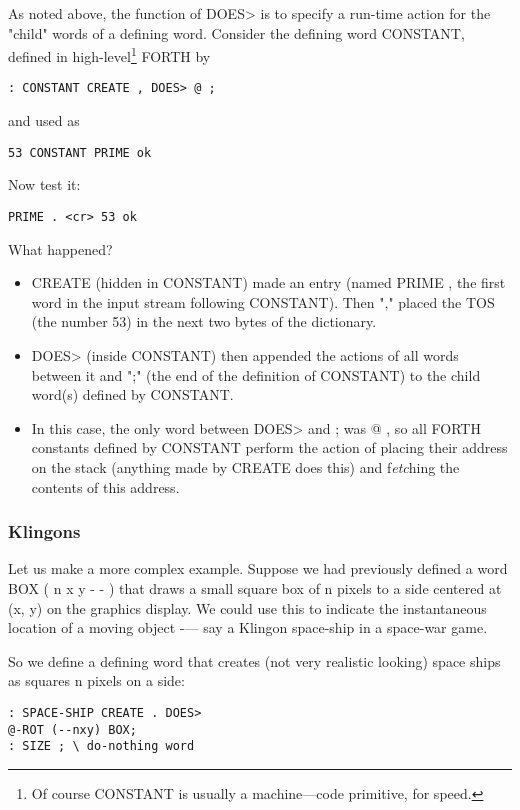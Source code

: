 As noted above, the function of DOES> is to specify a run-time action for the "child" words of a defining word. Consider the defining word CONSTANT, defined in high-level\footnote{Of course CONSTANT is usually a machine—code primitive, for speed.} FORTH by

\begin{verbatim}
: CONSTANT CREATE , DOES> @ ;
\end{verbatim}
and used as
\begin{verbatim}
53 CONSTANT PRIME ok
\end{verbatim}

Now test it:
\begin{verbatim}
PRIME . <cr> 53 ok
\end{verbatim}

What happened?
\begin{itemize}
    \item CREATE (hidden in CONSTANT) made an entry (named PRIME , the first word in the input stream following CONSTANT). Then "," placed the TOS (the number 53) in the next two bytes of the dictionary.
    \item DOES> (inside CONSTANT) then appended the actions of all words between it and ";" (the end of the definition of CONSTANT) to the child word(s) defined by CONSTANT.
    \item In this case, the only word between DOES> and ; was @ , so all FORTH constants defined by CONSTANT perform the action of placing their address on the stack (anything made by CREATE does this) and f\textit{etc}hing the contents of this address.
\end{itemize}

\subsubsection{Klingons}
Let us make a more complex example. Suppose we had previously defined a word BOX ( n x y - - ) that draws a small square box of n pixels to a side centered at (x, y) on the graphics display. We could use this to indicate the instantaneous location of a moving object -— say a Klingon space-ship in a space-war game.

So we define a defining word that creates (not very realistic looking) space ships as squares n pixels on a side:

\begin{verbatim}
: SPACE-SHIP CREATE . DOES>
@-ROT (--nxy) BOX;
: SIZE ; \ do-nothing word
\end{verbatim}


